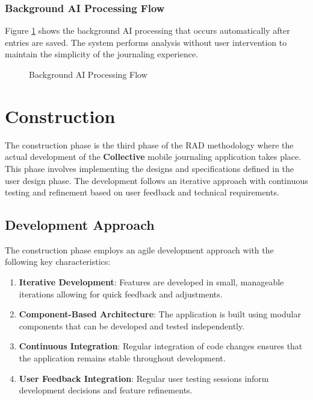 \subsubsection{Background AI Processing Flow}\label{subsubsec:aiProcessingFlow}

Figure \ref{fig:ai-processing-flow} shows the background AI processing that occurs automatically after entries are saved. The system performs analysis without user intervention to maintain the simplicity of the journaling experience.

\begin{figure}[H]
\centering

\caption{Background AI Processing Flow}
\label{fig:ai-processing-flow}
\end{figure}

\section{Construction}\label{sec:construction}

The construction phase is the third phase of the RAD methodology where the actual development of the \textbf{Collective} mobile journaling application takes place. This phase involves implementing the designs and specifications defined in the user design phase. The development follows an iterative approach with continuous testing and refinement based on user feedback and technical requirements.

\subsection{Development Approach}\label{subsec:developmentApproach}

The construction phase employs an agile development approach with the following key characteristics:

\begin{enumerate}
    \item \textbf{Iterative Development}: Features are developed in small, manageable iterations allowing for quick feedback and adjustments.
    
    \item \textbf{Component-Based Architecture}: The application is built using modular components that can be developed and tested independently.
    
    \item \textbf{Continuous Integration}: Regular integration of code changes ensures that the application remains stable throughout development.
    
    \item \textbf{User Feedback Integration}: Regular user testing sessions inform development decisions and feature refinements.
\end{enumerate}

